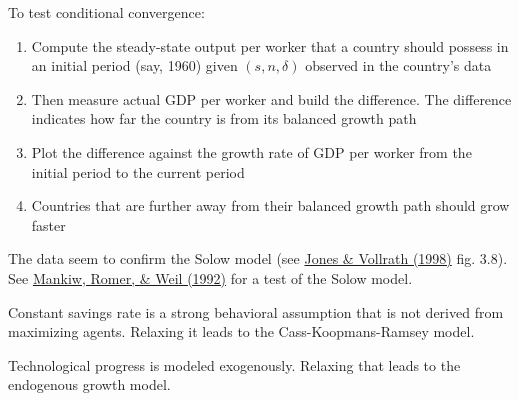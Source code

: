 \documentclass[10pt]{article}
\begin{document}
To test conditional convergence:
\begin{enumerate}
	\item Compute the steady-state output per worker that a country should possess in an initial period (say, 1960) given $(s,n,\delta)$ observed in the country's data
	\item Then measure actual GDP per worker and build the difference. The difference indicates how far the country is from its balanced growth path
	\item Plot the difference against the growth rate of GDP per worker from the initial period to the current period
	\item Countries that are further away from their balanced growth path should grow faster
\end{enumerate}

The data seem to confirm the Solow model (see \href{https://wwnorton.com/books/9781324059578}{Jones \& Vollrath (1998)} fig. 3.8). See \href{https://eml.berkeley.edu/~dromer/papers/MRW_QJE1992.pdf}{Mankiw, Romer, \& Weil (1992)} for a test of the Solow model.

\begin{remark}
	Constant savings rate is a strong behavioral assumption that is not derived from maximizing agents. Relaxing it leads to the Cass-Koopmans-Ramsey model.
\end{remark}
\begin{remark}
	Technological progress is modeled exogenously. Relaxing that leads to the endogenous growth model.
\end{remark}
\end{document}
